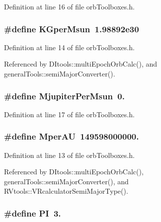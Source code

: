Definition at line 16 of file orb\-Toolboxes.\-h.

\subsubsection[{K\-Gper\-Msun}]{\setlength{\rightskip}{0pt plus 5cm}\#define K\-Gper\-Msun~1.\-98892e30}\label{orb_toolboxes_8h_abc3a507fe5d83a094e248e04cdeca200}


Definition at line 14 of file orb\-Toolboxes.\-h.



Referenced by D\-Itools\-::multi\-Epoch\-Orb\-Calc(), and general\-Tools\-::semi\-Major\-Converter().

\subsubsection[{Mjupiter\-Per\-Msun}]{\setlength{\rightskip}{0pt plus 5cm}\#define Mjupiter\-Per\-Msun~0.}\label{orb_toolboxes_8h_aba0b0a824fcc2e8824b4fe5de417aa7b}


Definition at line 17 of file orb\-Toolboxes.\-h.

\subsubsection[{Mper\-A\-U}]{\setlength{\rightskip}{0pt plus 5cm}\#define Mper\-A\-U~149598000000.}\label{orb_toolboxes_8h_a604a0af0f4e0e0937d76de54094a79f7}


Definition at line 13 of file orb\-Toolboxes.\-h.



Referenced by D\-Itools\-::multi\-Epoch\-Orb\-Calc(), general\-Tools\-::semi\-Major\-Converter(), and R\-Vtools\-::\-V\-Rcalculator\-Semi\-Major\-Type().

\subsubsection[{P\-I}]{\setlength{\rightskip}{0pt plus 5cm}\#define P\-I~3.}\label{orb_toolboxes_8h_a598a3330b3c21701223ee0ca14316eca}


